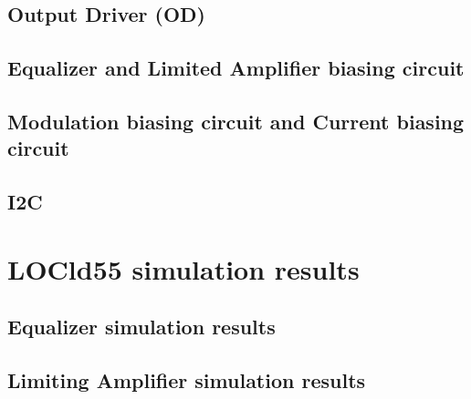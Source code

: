 \documentclass[11pt,a4paper]{article}
\begin{document}
\begin{spacing}{1.25}
\subsection{Output Driver (OD)}

\subsection{Equalizer and Limited Amplifier biasing circuit}

\subsection{Modulation biasing circuit and Current biasing circuit}

\subsection{I2C}

\section{LOCld55 simulation results}        %

\subsection{Equalizer simulation results}

\subsection{Limiting Amplifier simulation results}


\end{spacing}


\setcounter{section}{7}

\end{document}
